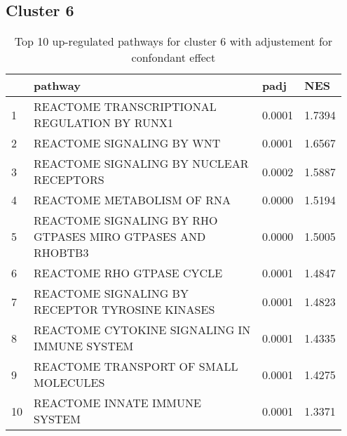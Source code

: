 \documentclass{article}
\begin{document}
\subsection{Cluster 6 }
\begin{table}[H]
\centering
\begin{tabular}{p{0.05\linewidth}p{0.7\linewidth}p{0.1\linewidth}p{0.1\linewidth}}
  \hline
 & pathway & padj & NES \\ 
  \hline
1 & REACTOME TRANSCRIPTIONAL REGULATION BY RUNX1 & 0.0001 & 1.7394 \\ 
  2 & REACTOME SIGNALING BY WNT & 0.0001 & 1.6567 \\ 
  3 & REACTOME SIGNALING BY NUCLEAR RECEPTORS & 0.0002 & 1.5887 \\ 
  4 & REACTOME METABOLISM OF RNA & 0.0000 & 1.5194 \\ 
  5 & REACTOME SIGNALING BY RHO GTPASES MIRO GTPASES AND RHOBTB3 & 0.0000 & 1.5005 \\ 
  6 & REACTOME RHO GTPASE CYCLE & 0.0001 & 1.4847 \\ 
  7 & REACTOME SIGNALING BY RECEPTOR TYROSINE KINASES & 0.0001 & 1.4823 \\ 
  8 & REACTOME CYTOKINE SIGNALING IN IMMUNE SYSTEM & 0.0001 & 1.4335 \\ 
  9 & REACTOME TRANSPORT OF SMALL MOLECULES & 0.0001 & 1.4275 \\ 
  10 & REACTOME INNATE IMMUNE SYSTEM & 0.0001 & 1.3371 \\ 
   \hline
\end{tabular}
\caption{Top 10 up-regulated pathways for cluster 6 with adjustement for confondant effect} 
\label{tab:q3_2_conf_6}
\end{table}
\end{document}
